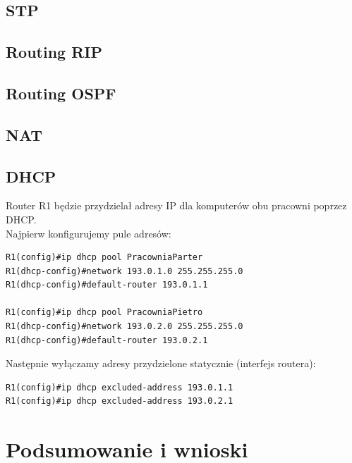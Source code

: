 \documentclass[11pt,a4paper]{article}
\begin{document}
\subsection{STP}
\subsection{Routing RIP}
\subsection{Routing OSPF}
\subsection{NAT}
\subsection{DHCP}
Router R1 będzie przydzielał adresy IP dla komputerów obu pracowni poprzez DHCP.\\
Najpierw konfigurujemy pule adresów:
\begin{lstlisting}
R1(config)#ip dhcp pool PracowniaParter
R1(dhcp-config)#network 193.0.1.0 255.255.255.0
R1(dhcp-config)#default-router 193.0.1.1

R1(config)#ip dhcp pool PracowniaPietro
R1(dhcp-config)#network 193.0.2.0 255.255.255.0
R1(dhcp-config)#default-router 193.0.2.1
\end{lstlisting}
Następnie wyłączamy adresy przydzielone statycznie (interfejs routera):
\begin{lstlisting}
R1(config)#ip dhcp excluded-address 193.0.1.1
R1(config)#ip dhcp excluded-address 193.0.2.1
\end{lstlisting}


\section{Podsumowanie i wnioski}
\end{document}
